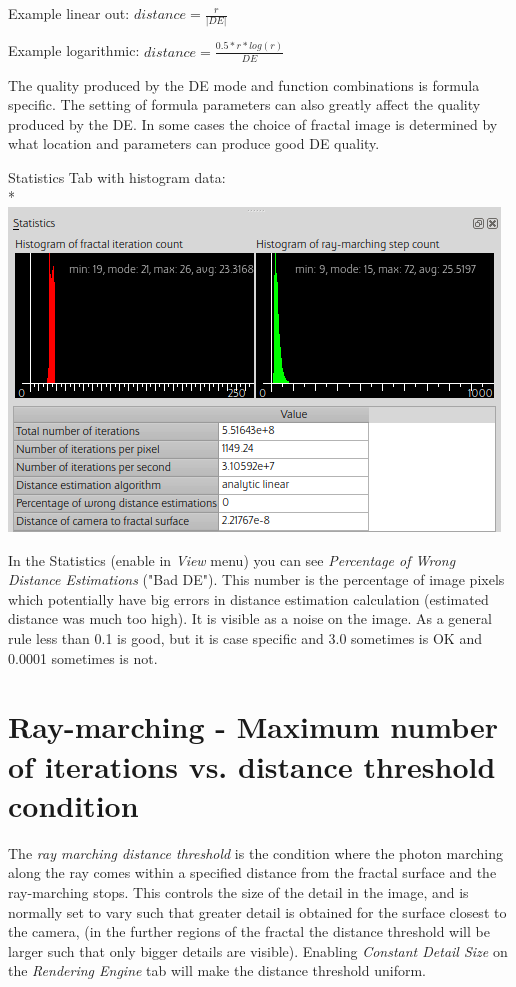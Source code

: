 Example linear out: $ distance = \frac{r}{\lvert DE \rvert} $

Example logarithmic: $ distance = \frac{0.5 * r * log(r)}{DE} $

The quality produced by the DE mode and function combinations is formula
specific. The setting of formula parameters can also greatly affect the quality
produced by the DE. In some cases the choice of fractal image is determined by
what location and parameters can produce good DE quality.

Statistics Tab with histogram data:\\*
\includegraphics[width=0.7\linewidth]{img/manual/media/dock_statistics.png}

In the Statistics (enable in \emph{View} menu) you can see \emph{Percentage of
	Wrong Distance Estimations} ("Bad DE"). This number is the percentage of image
pixels which potentially have big errors in distance estimation calculation
(estimated distance was much too high). It is visible as a noise on the image.
As a general rule less than 0.1 is good, but it is case specific and 3.0
sometimes is OK and 0.0001 sometimes is not.

\section{Ray-marching - Maximum number of iterations vs. distance threshold
	condition}\label{ray-marching---maximum-number-of-iterations-vs.-distance-threshold-condition}

The \emph{ray marching distance threshold} is the condition where the photon
marching along the ray comes within a specified distance from the fractal
surface and the ray-marching stops. This controls the size of the detail in the
image, and is normally set to vary such that greater detail is obtained for the
surface closest to the camera, (in the further regions of the fractal the
distance threshold will be larger such that only bigger details are visible).
Enabling \emph{Constant Detail Size} on the \emph{Rendering Engine} tab will
make the distance threshold uniform.

